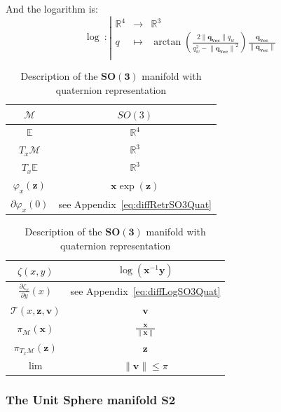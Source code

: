 And the logarithm is:
\begin{equation}
  \log\ :\left|
  \begin{array}{ccc}
    \mathbb{R}^4 & \rightarrow & \mathbb{R}^3 \\
    q & \mapsto & \arctan \left( \frac{2 \|\mathbf{q_{vec}}\| q_w}{q_w^2 - {\|\mathbf{q_{vec}\|}^2}} \right) \frac{\mathbf{q_{vec} } }{\|\mathbf{q_{vec}}\|} \\
  \end{array}
  \right.
\end{equation}


\begin{table} [H]
\caption{Description of the $\mathbf{SO(3)}$ manifold with quaternion representation}
\centering
\begin{tabular}{cc}
  \toprule
  $\mathcal{M}$ & $SO(3)$ \\
  \midrule
  $\mathbb{E}$ & $\mathbb{R}^{4}$ \\
  \midrule
  $T_x\mathcal{M}$ & $\mathbb{R}^3$ \\
  \midrule
  $T_x\mathbb{E}$ & $\mathbb{R}^3$ \\
  \midrule
  $\varphi_x(\mathbf{z})$ & $\mathbf{x}\exp(\mathbf{z})$ \\
  \midrule
  $\partial \varphi_x(0)$ & see Appendix~\ref{eq:diffRetrSO3Quat} \\
  \bottomrule
\end{tabular}
\quad
\begin{tabular}{cc}
  \toprule
  $\zeta(x,y)$ & $\log(\mathbf{x}^{-1}\mathbf{y})$ \\
  \midrule
  $\frac{\partial \zeta_x}{\partial y}(x)$ & see Appendix~\ref{eq:diffLogSO3Quat} \\
  \midrule
  $\mathcal{T}(x,\mathbf{z}, \mathbf{v})$ & $\mathbf{v}$ \\
  \midrule
  $\pi_\mathcal{M}(\mathbf{x})$ & $\frac{\mathbf{x}}{\|\mathbf{x}\|}$ \\
  \midrule
  $\pi_{T_x\mathcal{M}}(\mathbf{z})$ & $\mathbf{z}$ \\
  \midrule
  $\lim$ & $\|\mathbf{v}\| \leq \pi$ \\
  \bottomrule
\end{tabular}
\end{table}

\subsubsection{The Unit Sphere manifold $\mathbf{S2}$}
\label{ssub:the_unit_sphere_manifold_s2}

